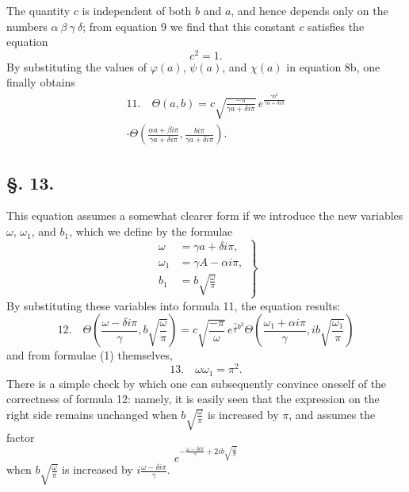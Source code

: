 \documentclass[10pt]{article}
\newcommand{\sourceanchor}[1]{\hypertarget{source-#1}{}}
\begin{document}
The quantity \(c\) is independent of both \(b\) and \(a\), and hence depends only on the numbers \(\alpha\ \beta\ \gamma\ \delta\); from equation 9 we find that this constant \(c\) satisfies the equation
\begin{equation*}
 c^{2}=1.
\tag{10.}
\end{equation*}
By substituting the values of \(\varphi(a)\), \(\psi(a)\), and \(\chi(a)\) in equation 8b, one finally obtains
\sourceanchor{PA11}
\begin{multline*}
11.\quad\Theta(a,b)=c\sqrt{\frac{-\pi}{\gamma a+\delta i\pi}}\,
 e^{\frac{\gamma b^{2}}{\gamma a+\delta i\pi}}\\
\cdot\Theta\!\left(\frac{\alpha a+\beta i\pi}{\gamma a+\delta i\pi},\frac{bi\pi}{\gamma a+\delta i\pi}\right).
\end{multline*}

\subsection*{\S. 13.}
This equation assumes a somewhat clearer form if we introduce the new variables \(\omega\), \(\omega_1\), and \(b_1\), which we define by the formulae
\begin{equation*}
\left.
\begin{aligned}
\omega&=\gamma a+\delta i\pi,\\
\omega_1&=\gamma A-\alpha i\pi,\\
b_1&=b\sqrt{\frac{\omega}{\pi}}
\end{aligned}
\right\}
\tag{1}
\end{equation*}
By substituting these variables into formula 11, the equation results:
\begin{equation*}
12.\quad
\Theta\!\left(\frac{\omega-\delta i\pi}{\gamma}, b\sqrt{\frac{\omega}{\pi}}\right)
=c\sqrt{\frac{-\pi}{\omega}}\,e^{\frac{\gamma}{\pi}b^{2}}
\Theta\!\left(\frac{\omega_1+\alpha i\pi}{\gamma}, ib\sqrt{\frac{\omega_1}{\pi}}\right)
\end{equation*}
and from formulae (1) themselves,
\begin{equation*}
13.\quad \omega\omega_1=\pi^{2}.
\end{equation*}
There is a simple check by which one can subsequently convince oneself of the correctness of formula 12: namely, it is easily seen that the expression on the right side remains unchanged when \(b\sqrt{\frac{\omega}{\pi}}\) is increased by \(\pi\), and assumes the factor
\[
e^{-\frac{\omega-\delta i\pi}{\gamma}+2ib\sqrt{\frac{\omega}{\pi}}}
\]
when \(b\sqrt{\frac{\omega}{\pi}}\) is increased by \(i\frac{\omega-\delta i\pi}{\gamma}\).
\end{document}
